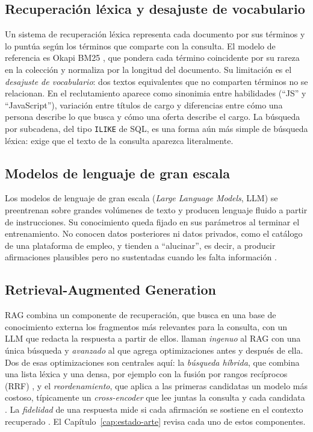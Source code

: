 \subsection{Recuperación léxica y desajuste de vocabulario}

Un sistema de recuperación léxica representa cada documento por sus términos y lo puntúa según los términos que comparte con la consulta. El modelo de referencia es Okapi BM25 \citep{Robertson2009}, que pondera cada término coincidente por su rareza en la colección y normaliza por la longitud del documento. Su limitación es el \emph{desajuste de vocabulario}: dos textos equivalentes que no comparten términos no se relacionan. En el reclutamiento aparece como sinonimia entre habilidades (\enquote{JS} y \enquote{JavaScript}), variación entre títulos de cargo y diferencias entre cómo una persona describe lo que busca y cómo una oferta describe el cargo. La búsqueda por subcadena, del tipo \texttt{ILIKE} de SQL, es una forma aún más simple de búsqueda léxica: exige que el texto de la consulta aparezca literalmente.

\subsection{Modelos de lenguaje de gran escala}

Los modelos de lenguaje de gran escala (\textit{Large Language Models}, LLM) se preentrenan sobre grandes volúmenes de texto y producen lenguaje fluido a partir de instrucciones. Su conocimiento queda fijado en sus parámetros al terminar el entrenamiento. No conocen datos posteriores ni datos privados, como el catálogo de una plataforma de empleo, y tienden a \enquote{alucinar}, es decir, a producir afirmaciones plausibles pero no sustentadas cuando les falta información \citep{Gao2023}.

\subsection{Retrieval-Augmented Generation}

RAG \citep{Lewis2020} combina un componente de recuperación, que busca en una base de conocimiento externa los fragmentos más relevantes para la consulta, con un LLM que redacta la respuesta a partir de ellos. \citet{Gao2023} llaman \emph{ingenuo} al RAG con una única búsqueda y \emph{avanzado} al que agrega optimizaciones antes y después de ella. Dos de esas optimizaciones son centrales aquí: la \emph{búsqueda híbrida}, que combina una lista léxica y una densa, por ejemplo con la fusión por rangos recíprocos (RRF) \citep{Cormack2009}, y el \emph{reordenamiento}, que aplica a las primeras candidatas un modelo más costoso, típicamente un \textit{cross-encoder} que lee juntas la consulta y cada candidata \citep{Nogueira2019}. La \emph{fidelidad} de una respuesta mide si cada afirmación se sostiene en el contexto recuperado \citep{Es2024}. El Capítulo~\ref{cap:estado-arte} revisa cada uno de estos componentes.

